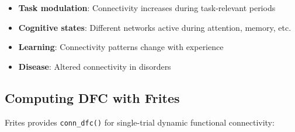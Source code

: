 \documentclass[
  11pt,
  letterpaper,
  oneside,
  openany]{book}
\providecommand{\tightlist}{%
  \setlength{\itemsep}{0pt}\setlength{\parskip}{0pt}}
\begin{document}
\begin{itemize}
\tightlist
\item
  \textbf{Task modulation}: Connectivity increases during task-relevant
  periods
\item
  \textbf{Cognitive states}: Different networks active during attention,
  memory, etc.
\item
  \textbf{Learning}: Connectivity patterns change with experience
\item
  \textbf{Disease}: Altered connectivity in disorders
\end{itemize}

\subsection{Computing DFC with Frites}\label{computing-dfc-with-frites}

Frites provides \texttt{conn\_dfc()} for single-trial dynamic functional
connectivity:
\end{document}
